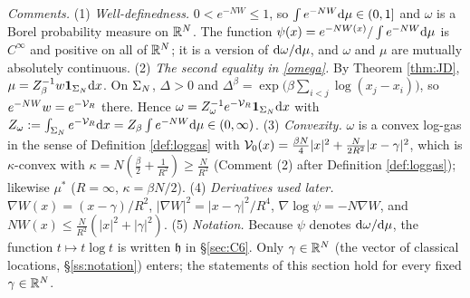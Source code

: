 \noindent\emph{Comments.}
(1) \emph{Well-definedness.} $0<e^{-NW}\le1$, so $\int e^{-NW}\mathrm{d}\mu\in(0,1]$ and $\omega$ is a Borel probability measure on $\mathbb{R}^N$. The function $\psi(x)=e^{-NW(x)}/\int e^{-NW}\mathrm{d}\mu$ is $C^\infty$ and positive on all of $\mathbb{R}^N$; it is a version of $\mathrm{d}\omega/\mathrm{d}\mu$, and $\omega$ and $\mu$ are mutually absolutely continuous.
(2) \emph{The second equality in \eqref{omega}.} By Theorem \ref{thm:JD}, $\mu=Z_\beta^{-1}w\mathbf 1_{\Sigma_N}\mathrm{d} x$. On $\Sigma_N$, $\Delta>0$ and $\Delta^\beta=\exp\big(\beta\sum_{i<j}\log(x_j-x_i)\big)$, so $e^{-NW}w=e^{-\mathcal{V}_R}$ there. Hence $\omega=Z_\omega^{-1}e^{-\mathcal{V}_R}\mathbf 1_{\Sigma_N}\mathrm{d} x$ with
$Z_\omega:=\int_{\Sigma_N}e^{-\mathcal{V}_R}\mathrm{d} x=Z_\beta\int e^{-NW}\mathrm{d}\mu\in(0,\infty)$.
(3) \emph{Convexity.} $\omega$ is a convex log-gas in the sense of Definition \ref{def:loggas} with $\mathcal{V}_0(x)=\frac{\beta N}4|x|^2+\frac N{2R^2}|x-\gamma|^2$, which is $\kappa$-convex with $\kappa=N(\frac\beta2+\frac1{R^2})\ge\frac N{R^2}$ (Comment (2) after Definition \ref{def:loggas}); likewise $\mu^*$ ($R=\infty$, $\kappa=\beta N/2$).
(4) \emph{Derivatives used later.} $\nabla W(x)=(x-\gamma)/R^2$, $|\nabla W|^2=|x-\gamma|^2/R^4$, $\nabla\log\psi=-N\nabla W$, and $NW(x)\le\frac N{R^2}(|x|^2+|\gamma|^2)$.
(5) \emph{Notation.} Because $\psi$ denotes $\mathrm{d}\omega/\mathrm{d}\mu$, the function $t\mapsto t\log t$ is written $\mathfrak h$ in \S\ref{sec:C6}. Only $\gamma\in\mathbb{R}^N$ (the vector of classical locations, \S\ref{ss:notation}) enters; the statements of this section hold for every fixed $\gamma\in\mathbb{R}^N$.
